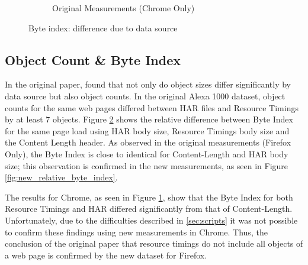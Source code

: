 \begin{figure}
\begin{subfigure}{\linewidth}
	\caption{Original Measurements (Chrome Only)}
	\label{fig:orig_chrome_relative_byte_index}
\end{subfigure}
\caption{Byte index: difference due to data source}
\label{fig:relative_byte_index}
\end{figure}

\subsection{Object Count \& Byte Index}
In the original paper, \citeauthor{10.1007/978-3-030-15986-3_19} found that not only do object sizes differ significantly by data source but also object counts. In the original Alexa 1000 dataset, object counts for the same web pages differed between HAR files and Resource Timings by at least 7 objects. Figure \ref{fig:relative_byte_index} shows the relative difference between Byte Index for the same page load using HAR body size, Resource Timings body size and the Content Length header. As observed in the original measurements (Firefox Only), the Byte Index is close to identical for Content-Length and HAR body size; this observation is confirmed in the new measurements, as seen in Figure \ref{fig:new_relative_byte_index}. 

The results for Chrome, as seen in Figure \ref{fig:orig_chrome_relative_byte_index}, show that the Byte Index for both Resource Timings and HAR differed significantly from that of Content-Length. Unfortunately, due to the difficulties described in \ref{sec:scripts} it was not possible to confirm these findings using new measurements in Chrome. Thus, the conclusion of the original paper that resource timings do not include all objects of a web page is confirmed by the new dataset for Firefox.